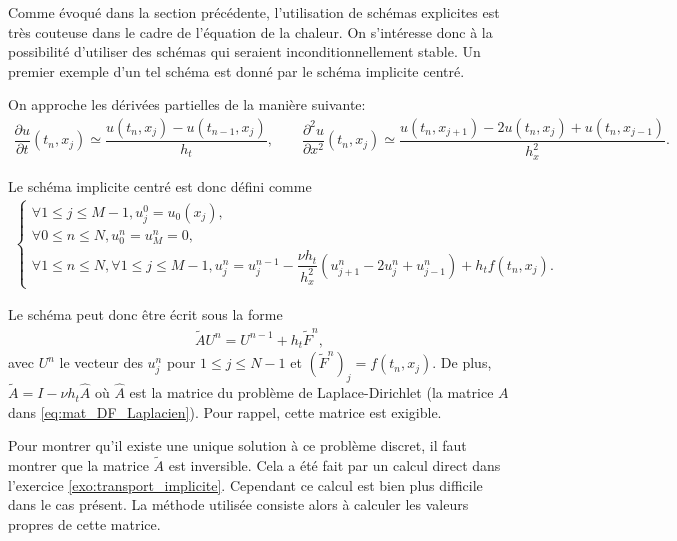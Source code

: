 \documentclass[12pt,a4paper,twoside]{article}
\begin{document}
Comme \'evoqu\'e dans la section pr\'ec\'edente, l'utilisation de sch\'emas
explicites est tr\`es couteuse dans le cadre de l'\'equation de la chaleur.
On s'int\'eresse donc \`a la possibilit\'e d'utiliser des sch\'emas
qui seraient inconditionnellement stable.
Un premier exemple d'un tel sch\'ema est donn\'e par le sch\'ema 
implicite centr\'e.


On approche les d\'eriv\'ees partielles de la mani\`ere suivante:
\begin{align*}
  \dfrac{\partial u}{\partial t}(t_n,x_j) \simeq \dfrac{u(t_{n},x_j) - u(t_{n-1},x_j)}{h_t} ,
  \qquad 
  \dfrac{\partial^2 u}{\partial x^2}(t_n,x_j) 
  \simeq \dfrac{u(t_{n},x_{j+1}) - 2 u(t_n,x_j) + u(t_n,x_{j-1})}{h_x^2} .
\end{align*}




Le sch\'ema implicite centr\'e est donc d\'efini comme
\begin{align}
  \label{eq:chaleur_DF_exp_centre}
  \left\{
  \begin{array}{l}
    \forall 1 \leq j \leq M-1 , 
    u_j^0 = u_0(x_j) ,
    \\
    \forall 0 \leq n \leq N, u_0^n = u_M^n = 0 ,
    \\
    \forall 1 \leq n \leq N, \forall 1 \leq j \leq M-1,
    u_j^{n} = u_j^{n-1} - \dfrac{\nu h_t}{h_x^2} (u_{j+1}^{n} - 2 u_{j}^{n} + u_{j-1}^{n} ) 
    + h_t f(t_n,x_j) .
  \end{array}
  \right.
\end{align}

Le sch\'ema peut donc \^etre \'ecrit sous la forme
\begin{align*}
  \widetilde{A} U^n = U^{n-1} + h_t \widetilde{F}^n ,
\end{align*}
avec $U^n$ le vecteur des $u_j^n$ pour $1 \leq j \leq N-1$ et $(\widetilde{F}^n)_j = f(t_n,x_j)$. 
De plus, $\widetilde{A} = I - \nu h_t \widehat{A}$ o\`u $\widehat{A}$ est la matrice
du probl\`eme de Laplace-Dirichlet (la matrice $A$ dans \eqref{eq:mat_DF_Laplacien}).
Pour rappel, cette matrice est exigible.


Pour montrer qu'il existe une unique solution \`a ce probl\`eme discret,
il faut montrer que la matrice $\widetilde{A}$ est inversible.
Cela a \'et\'e fait par un calcul direct dans l'exercice \ref{exo:transport_implicite}.
Cependant ce calcul est bien plus difficile dans le cas pr\'esent.
La m\'ethode utilis\'ee consiste alors \`a calculer les valeurs propres de cette matrice.
\end{document}
